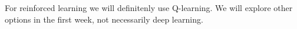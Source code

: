 For reinforced learning we will definitenly use Q-learning. We will explore
other options in the first week, not necessarily deep learning.
